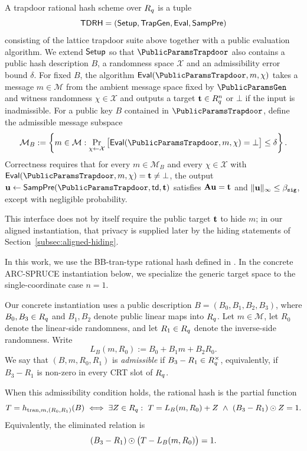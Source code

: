 \begin{definition}\label{def:trapdoor-rational-hash}
A trapdoor rational hash scheme over \(R_q\) is a tuple
\[
  \mathsf{TDRH}=(\mathsf{Setup},\mathsf{TrapGen},\mathsf{Eval},\mathsf{SampPre})
\]
consisting of the lattice trapdoor suite above together with a public evaluation algorithm. We extend
\(\mathsf{Setup}\) so that $\PublicParamsTrapdoor$ also contains a public hash description \(B\), a randomness space \(\mathcal{X}\) and an
admissibility error bound \(\delta\). For fixed \(B\), the algorithm
\(\Eval(\PublicParamsTrapdoor,m,\chi)\) takes a message \(m\in\mathcal{M}\) from the ambient message space fixed by
\(\PublicParamsGen\) and witness randomness \(\chi\in\mathcal{X}\) and outputs a
target \(\mathbf{t}\in R_q^n\) or \(\bot\) if the input is inadmissible.
 For a public key \(B\) contained in $\PublicParamsTrapdoor$, define the admissible message subspace
\[
  \mathcal{M}_B:=\left\{m\in\mathcal{M} :
  \Pr_{\chi\gets \mathcal{X}}\big[\Eval(\PublicParamsTrapdoor,m,\chi)=\bot\big]\le \delta\right\}\text{.}
\]
Correctness requires that for
every \(m\in\mathcal{M}_B\) and every \(\chi\in\mathcal{X}\) with \(\Eval(\PublicParamsTrapdoor,m,\chi)=\vect\neq\bot\), the output
\(\vecu\gets \SampPre(\PublicParamsTrapdoor,\trapdoor,\vect)\) satisfies \(\mathbf{A}\mathbf{u}=\mathbf{t}\) and \(\|\mathbf{u}\|_\infty\le \beta_{\mathtt{sig}}\), except with
negligible probability.
\end{definition}
This interface does not by itself require the public target \(\mathbf{t}\) to hide \(m\); in our aligned instantiation,
that privacy is supplied later by the hiding statements of Section~\ref{subsec:aligned-hiding}.

In this work, we use the BB-tran-type rational hash defined in \cite[Table~1]{EPRINT:DKLW25}. In the concrete
ARC-SPRUCE instantiation below, we specialize the generic target space to the single-coordinate case \(n=1\).

\begin{definition}\label{def:rational-hash}
Our concrete instantiation uses a public description \(B=(B_0,B_1,B_2,B_3)\), where \(B_0,B_3\in R_q\) and
\(B_1,B_2\) denote public linear maps into \(R_q\). Let \(m\in\mathcal{M}\), let \(R_0\) denote the linear-side
randomness, and let \(R_1\in R_q\) denote the inverse-side randomness. Write
\[
L_B(m,R_0):=B_0+B_1m+B_2R_0.
\]
We say that \((B,m,R_0,R_1)\) is \emph{admissible} if \(B_3-R_1\in R_q^\times\), equivalently, if
\(B_3-R_1\) is non-zero in every CRT slot of \(R_q\).

When this admissibility condition holds, the rational hash is the partial function
\[
T=h_{\mathrm{tran},m,(R_0,R_1)}(B)
\iff
\exists Z\in R_q:\ T=L_B(m,R_0)+Z\ \land\ (B_3-R_1)\odot Z=1.
\]
Equivalently, the eliminated relation is
\begin{equation}\label{eq:hash-cleared}
  (B_3-R_1)\odot\bigl(T-L_B(m,R_0)\bigr)=1.
\end{equation}
\end{definition}

